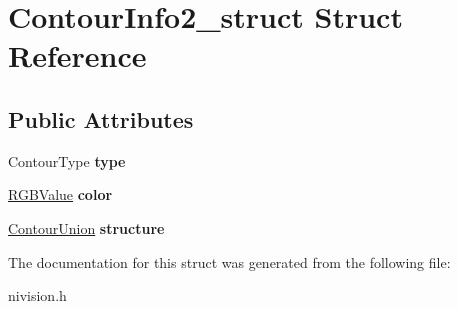 \hypertarget{structContourInfo2__struct}{\section{\-Contour\-Info2\-\_\-struct \-Struct \-Reference}
\label{structContourInfo2__struct}
}
\subsection*{\-Public \-Attributes}
\begin{DoxyCompactItemize}
\item 
\hypertarget{structContourInfo2__struct_afa16a54510ab7cd85f664f19b270fe4e}{\-Contour\-Type {\bfseries type}}\label{structContourInfo2__struct_afa16a54510ab7cd85f664f19b270fe4e}

\item 
\hypertarget{structContourInfo2__struct_a7d5a43fc540e1be2e7597579c8619b2a}{\hyperlink{structRGBValue__struct}{\-R\-G\-B\-Value} {\bfseries color}}\label{structContourInfo2__struct_a7d5a43fc540e1be2e7597579c8619b2a}

\item 
\hypertarget{structContourInfo2__struct_ae3ff34c089b48c836be917e1c4a94ca2}{\hyperlink{unionContourUnion__union}{\-Contour\-Union} {\bfseries structure}}\label{structContourInfo2__struct_ae3ff34c089b48c836be917e1c4a94ca2}

\end{DoxyCompactItemize}


\-The documentation for this struct was generated from the following file\-:\begin{DoxyCompactItemize}
\item 
nivision.\-h\end{DoxyCompactItemize}
